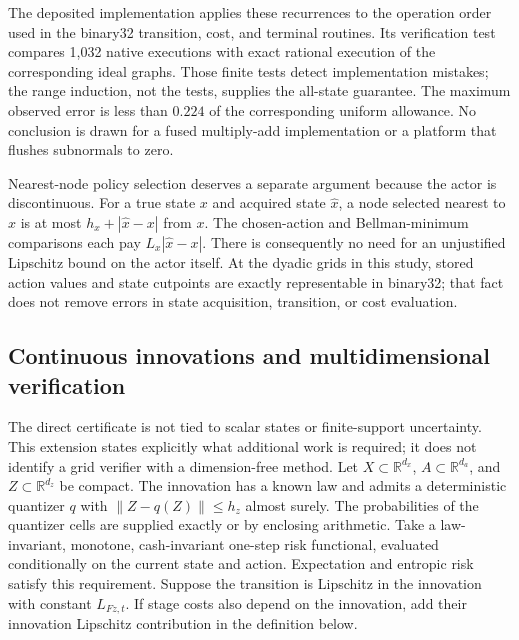 \documentclass[ecta,nameyear,draft]{econsocart}
\theoremstyle{definition}
\theoremstyle{remark}
\begin{document}
The deposited implementation applies these recurrences to the operation
order used in the binary32 transition, cost, and terminal routines.
Its verification test compares 1,032 native executions with exact rational
execution of the corresponding ideal graphs. Those finite tests detect
implementation mistakes; the range induction, not the tests, supplies the
all-state guarantee. The maximum observed error is less than $0.224$ of
the corresponding uniform allowance. No conclusion is drawn for a fused
multiply-add implementation or a platform that flushes subnormals to zero.

Nearest-node policy selection deserves a separate argument because the
actor is discontinuous. For a true state $x$ and acquired state
$\widehat x$, a node selected nearest to $\widehat x$ is at most
$h_x+|\widehat x-x|$ from $x$. The chosen-action and Bellman-minimum
comparisons each pay $L_x|\widehat x-x|$. There is consequently no need
for an unjustified Lipschitz bound on the actor itself. At the dyadic grids
in this study, stored action values and state cutpoints are exactly
representable in binary32; that fact does not remove errors in state
acquisition, transition, or cost evaluation.

\subsection{Continuous innovations and multidimensional verification}
\label{app:r41work}
The direct certificate is not tied to scalar states or finite-support
uncertainty. This extension states explicitly what additional work is
required; it does not identify a grid verifier with a dimension-free
method. Let $X\subset\mathbb R^{d_x}$, $A\subset\mathbb R^{d_a}$, and
$Z\subset\mathbb R^{d_z}$ be compact. The innovation has a known law and
admits a deterministic quantizer $q$ with
$\|Z-q(Z)\|\leq h_z$ almost surely. The probabilities of the quantizer
cells are supplied exactly or by enclosing arithmetic. Take a law-invariant,
monotone, cash-invariant one-step risk functional, evaluated conditionally
on the current state and action. Expectation and entropic risk satisfy this
requirement. Suppose the transition is Lipschitz in the innovation with
constant $L_{Fz,t}$. If stage costs also depend on the innovation, add their
innovation Lipschitz contribution in the definition below.
\end{document}
